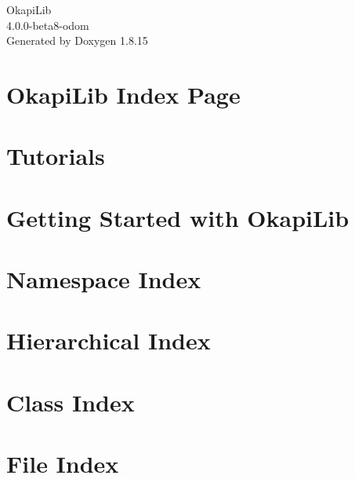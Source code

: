 \let\mypdfximage\pdfximage\def\pdfximage{\immediate\mypdfximage}\documentclass[twoside]{book}
\newcommand{\+}{\discretionary{\mbox{\scriptsize$\hookleftarrow$}}{}{}}
\newcommand{\clearemptydoublepage}{%
  \newpage{\pagestyle{empty}\cleardoublepage}%
}
\begin{document}
\hypersetup{pageanchor=false,
             bookmarksnumbered=true,
             pdfencoding=unicode
            }
\begin{titlepage}
\vspace*{7cm}
\begin{center}%
{\Large Okapi\+Lib \\[1ex]\large 4.\+0.\+0-\/beta8-\/odom }\\
\vspace*{1cm}
{\large Generated by Doxygen 1.8.15}\\
\end{center}
\end{titlepage}
\clearemptydoublepage
{}
\tableofcontents
\clearemptydoublepage
{}
\hypersetup{pageanchor=true}

\chapter{Okapi\+Lib Index Page}
\label{index}\hypertarget{index}{}
\chapter{Tutorials}
\label{md_docs_tutorials_index}

\chapter{Getting Started with Okapi\+Lib}
\label{md_docs_tutorials_walkthrough_gettingStarted}

\chapter{Namespace Index}

\chapter{Hierarchical Index}

\chapter{Class Index}

\chapter{File Index}

\end{document}
